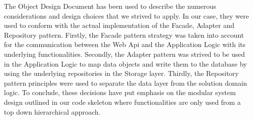 The Object Design Document has been used to describe the numerous considerations and design choices that we strived to apply. In our case, they were used to conform with the actual implementation of the Facade, Adapter and Repository pattern. Firstly, the Facade pattern strategy was taken into account for the communication between the Web Api and the Application Logic with its underlying functionalities. Secondly, the Adapter pattern was strived to be used in the Application Logic to map data objects and write them to the database by using the underlying repositories in the Storage layer. Thirdly, the Repository pattern principles were used to separate the data layer from the solution domain logic. %
To conclude, these decisions have put emphasis on the modular system design outlined in our code skeleton where functionalities are only used from a top down hierarchical approach. 